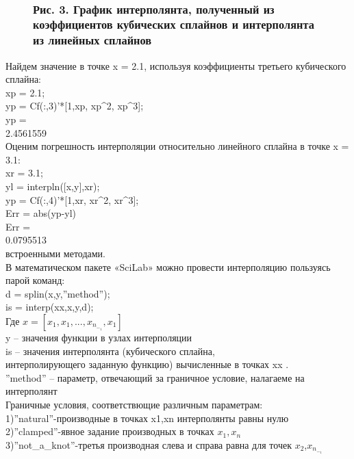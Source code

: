 \documentclass[russian,utf8,nocolumnxxxi,nocolumnxxxii]{eskdtext}
\begin{document}
\begin{figure}[H]
\begin{center}
\begin{minipage}[h]{0.70\linewidth}
  \\
\frametitle{Рис. 3. График интерполянта, полученный из коэффициентов кубических сплайнов и интерполянта из линейных сплайнов}
\end{minipage}
\end{center}
\end{figure}
Найдем значение в точке x = 2.1, используя коэффициенты третьего кубического сплайна:\\
xp = 2.1;\\
yp = Cf(:,3)’*[1,xp, xp^2, xp^3];\\
yp =\\
2.4561559\\
Оценим погрешность интерполяции относительно линейного сплайна в точке x = 3.1:\\
xr = 3.1;\\
yl = interpln([x,y],xr);\\
yp = Cf(:,4)’*[1,xr, xr^2, xr^3];\\
Err = abs(yp-yl)\\
Err =\\
0.0795513\\
\newpage
{ встроенными методами.}\\
В математическом пакете «SciLab» можно провести интерполяцию пользуясь парой команд:\\
d = splin(x,y,”method”);\\
is = interp(xx,x,y,d);\\
Где $x=[x_1,x_1,...,x_n_-_1,x_1]$\\
y – значения функции в узлах интерполяции\\
is – значения интерполянта (кубического сплайна,\\ интерполирующего заданную функцию) вычисленные в точках xx .\\
”method” – параметр, отвечающий за граничное условие, налагаеме на интерполянт\\
Граничные условия, соответствющие различным параметрам:\\
1)”natural”-производные в точках x1,xn интерполянты равны нулю\\
2)”clamped”-явное задание производных в точках $x_1,x_n$\\
3)”not\_a\_knot”-третья производная слева и справа равна для точек $x_2$,$x_n_-_1$\\
\end{document}
